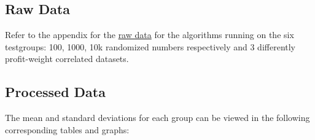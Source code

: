 \documentclass[titlepage]{article}
\begin{document}
\subsection{Raw Data}
Refer to the appendix for the \hyperlink{random100}{raw data} for the algorithms running on the six testgroups: 100, 1000, 10k randomized numbers respectively and 3 differently profit-weight correlated datasets. 

\subsection{Processed Data}
The mean and standard deviations for each group can be viewed in the following corresponding tables and graphs:
\end{document}

